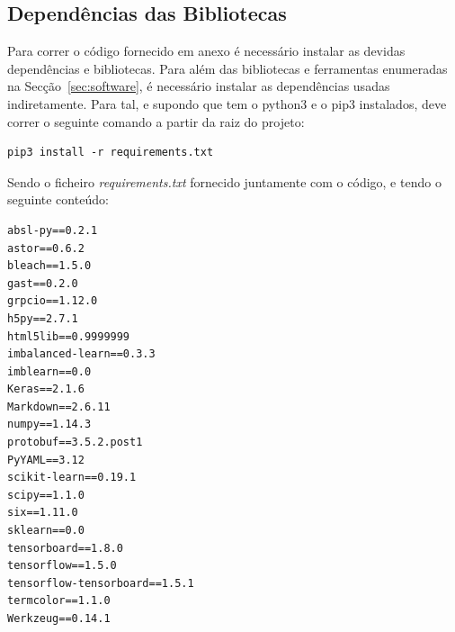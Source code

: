 \documentclass[]{article}
\begin{document}
\subsection{Dependências das Bibliotecas}
Para correr o código fornecido em anexo é necessário instalar as devidas dependências e bibliotecas. Para além das bibliotecas e ferramentas enumeradas na Secção~\ref{sec:software}, é necessário instalar as dependências usadas indiretamente. Para tal, e supondo que tem o python3 e o pip3 instalados, deve correr o seguinte comando a partir da raiz do projeto:
\begin{lstlisting}
pip3 install -r requirements.txt
\end{lstlisting}

Sendo o ficheiro \textit{requirements.txt} fornecido juntamente com o código, e tendo o seguinte conteúdo:

\begin{lstlisting}
absl-py==0.2.1
astor==0.6.2
bleach==1.5.0
gast==0.2.0
grpcio==1.12.0
h5py==2.7.1
html5lib==0.9999999
imbalanced-learn==0.3.3
imblearn==0.0
Keras==2.1.6
Markdown==2.6.11
numpy==1.14.3
protobuf==3.5.2.post1
PyYAML==3.12
scikit-learn==0.19.1
scipy==1.1.0
six==1.11.0
sklearn==0.0
tensorboard==1.8.0
tensorflow==1.5.0
tensorflow-tensorboard==1.5.1
termcolor==1.1.0
Werkzeug==0.14.1
\end{lstlisting}
\end{document}
